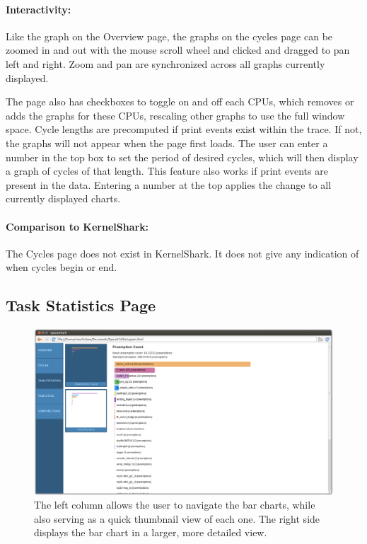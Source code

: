 \documentclass{hmcclinic}
\begin{document}
\paragraph{Interactivity:}    
    Like the graph on the Overview page, the graphs on the cycles page can be
    zoomed in and out with the mouse scroll wheel and clicked and dragged to pan
    left and right. Zoom and pan are synchronized across all graphs currently
    displayed.

    The page also has checkboxes to toggle on and off each CPUs, which removes
    or adds the graphs for these CPUs, rescaling other graphs to use the full window
    space. Cycle lengths are precomputed if print events exist within the trace. If
    not, the graphs will not appear when the page first loads. The user can enter a
    number in the top box to set the period of desired cycles, which will then
    display a graph of cycles of that length. This feature also works  if
    print events are present in the data. Entering a number at the top applies
    the change to all currently displayed charts.
        
\paragraph{Comparison to KernelShark:}
    The Cycles page does not exist in KernelShark. It does not give any indication of when cycles begin or end.
    
  \subsection{Task Statistics Page} %

  \begin{figure}[H]
  \includegraphics[width=5in]{task-statistics-page.png}
  \caption{The left column allows the user to navigate the bar charts, while
    also serving as a quick thumbnail view of each one. The right side displays
  the bar chart in a larger, more detailed view.}
  \end{figure}
\end{document}
